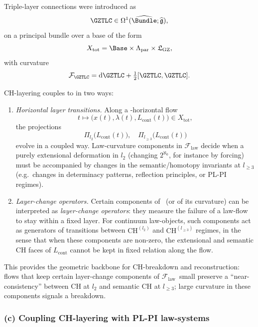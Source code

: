 \documentclass[11pt]{book}
\theoremstyle{plain}
\theoremstyle{definition}
\newcommand{\GZLS}{\ensuremath{\mathfrak{L}_{\mathrm{GZ}}}}       \newcommand{\GZLT}{\ensuremath{M_{!w}}}                           \newcommand{\GZLOC}{\ensuremath{A_M}}                             \newcommand{\GZLCurv}{\ensuremath{\mathcal{F}_{\mathrm{law}}}}
\begin{document}
Triple-layer connections were introduced as
\[
  \GZTLC \in \Omega^1(\widehat{\Bundle};\widehat{\mathfrak{g}}),
\]
on a principal bundle over a base of the form
\[
  X_{\mathrm{tot}} =
  \Base\times\Lambda_{\mathrm{par}}\times\GZLS,
\]
with curvature
\[
  \mathcal{F}_{\GZTLC}
  =
  \mathrm{d}\GZTLC
  + \tfrac{1}{2}[\GZTLC,\GZTLC].
\]

CH-layering couples to \GZTLC in two ways:

\begin{enumerate}[label=\roman*)]
  \item \emph{Horizontal layer transitions.}
        Along a \GZTLC-horizontal flow
        \[
          t\longmapsto
          \bigl(x(t),\lambda(t),L_{\mathrm{cont}}(t)\bigr)
          \in X_{\mathrm{tot}},
        \]
        the projections
        \[
          \Pi_{l_2}\bigl(L_{\mathrm{cont}}(t)\bigr),
          \quad
          \Pi_{l_{\ge3}}\bigl(L_{\mathrm{cont}}(t)\bigr)
        \]
        evolve in a coupled way. Law-curvature components in
        $\GZLCurv$ decide when a purely extensional deformation in
        $l_2$ (changing $2^{\aleph_0}$, for instance by forcing) must
        be accompanied by changes in the semantic/homotopy invariants
        at $l_{\ge3}$ (e.g.\ changes in determinacy patterns,
        reflection principles, or PL-PI regimes).
  \item \emph{Layer-change operators.}
        Certain components of \GZTLC\ (or of its curvature) can be
        interpreted as \emph{layer-change operators}: they measure the
        failure of a law-flow to stay within a fixed layer. For
        continuum law-objects, such components act as generators of
        transitions between $\mathrm{CH}^{(l_2)}$ and
        $\mathrm{CH}^{(l_{\ge3})}$ regimes, in the sense that when
        these components are non-zero, the extensional and semantic
        CH faces of $L_{\mathrm{cont}}$ cannot be kept in fixed
        relation along the flow.
\end{enumerate}

This provides the geometric backbone for CH-breakdown and
reconstruction: flows that keep certain layer-change components of
\GZLCurv\ small preserve a “near-consistency” between CH at $l_2$ and
semantic CH at $l_{\ge3}$; large curvature in these components signals
a breakdown.



\subsubsection*{(c) Coupling CH-layering with PL-PI law-systems}
\end{document}
